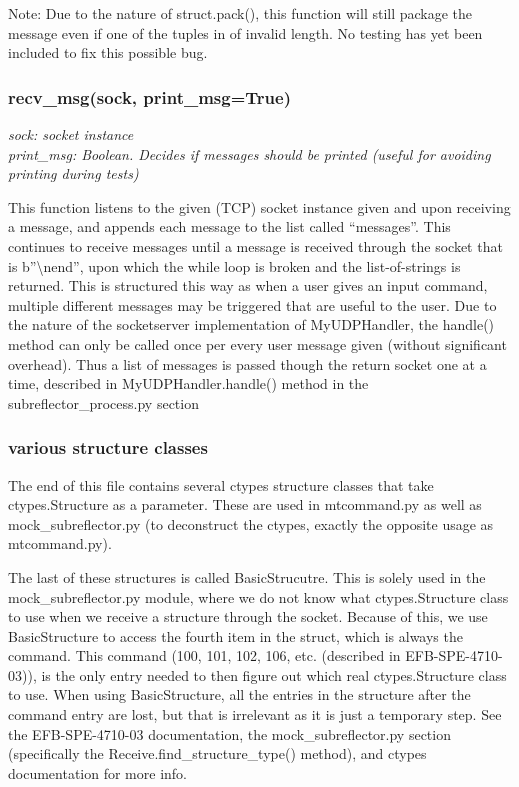 \documentclass{article}
\begin{document}
Note: Due to the nature of struct.pack(), this function will still package the message even if one of the tuples in of invalid length. No testing has yet been included to fix this possible bug. 

\subsubsection*{recv\_msg(sock, print\_msg=True)}
\emph{sock: socket instance}\\
\emph{print\_msg: Boolean. Decides if messages should be printed (useful for avoiding printing during tests)}
\vspace{10pt}

This function listens to the given (TCP) socket instance given and upon receiving a message, and appends each message to the list called ``messages''. This continues to receive messages until a message is received through the socket that is b''\textbackslash nend'', upon which the while loop is broken and the list-of-strings is returned. This is structured this way as when a user gives an input command, multiple different messages may be triggered that are useful to the user. Due to the nature of the socketserver implementation of MyUDPHandler, the handle() method can only be called once per every user message given (without significant overhead). Thus a list of messages is passed though the return socket one at a time, described in MyUDPHandler.handle() method in the subreflector\_process.py section


\subsubsection*{various structure classes}
The end of this file contains several ctypes structure classes that take ctypes.Structure as a parameter. These are used in mtcommand.py as well as mock\_subreflector.py (to deconstruct the ctypes, exactly the opposite usage as mtcommand.py). 

\vspace{10pt}

The last of these structures is called BasicStrucutre. This is solely used in the mock\_subreflector.py module, where we do not know what ctypes.Structure class to use when we receive a structure through the socket. Because of this, we use BasicStructure to access the fourth item in the struct, which is always the command. This command  (100, 101, 102, 106, etc. (described in EFB-SPE-4710-03)), is the only entry needed to then figure out which real ctypes.Structure class to use. When using BasicStructure, all the entries in the structure after the command entry are lost, but that is irrelevant as it is just a temporary step. See the EFB-SPE-4710-03 documentation, the mock\_subreflector.py section (specifically the Receive.find\_structure\_type() method), and ctypes documentation for more info.
\end{document}
